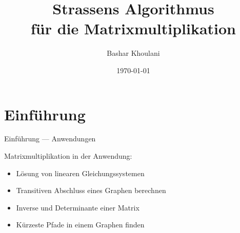 \documentclass[aspectratio=169]{beamer}
\title[Strassens Algorithmus]{Strassens Algorithmus \\ für die Matrixmultiplikation}
\author{Bashar Khoulani}
\institute[]{Universität Kassel}
\date{\today}
\begin{document}
\begin{frame}
    \titlepage
\end{frame}

\section{Einführung}
\begin{frame}{Einführung --- Anwendungen}
\uncover<+-> {
Matrixmultiplikation in der Anwendung:
\begin{itemize}[<+->]
\item Lösung von linearen Gleichungssystemen
\item Transitiven Abschluss eines Graphen berechnen
\item Inverse und Determinante einer Matrix
\item Kürzeste Pfade in einem Graphen finden
\end{itemize}
}
\end{frame}
\end{document}

